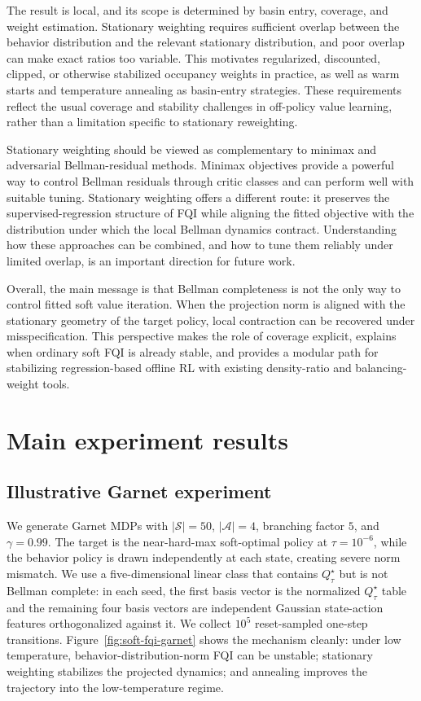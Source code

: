 \documentclass{article}
\theoremstyle{plain}
\theoremstyle{definition}
\theoremstyle{remark}
\begin{document}
The result is local, and its scope is determined by basin entry, coverage, and
weight estimation. Stationary weighting requires sufficient overlap between the
behavior distribution and the relevant stationary distribution, and poor overlap
can make exact ratios too variable. This motivates regularized, discounted,
clipped, or otherwise stabilized occupancy weights in practice, as well as warm
starts and temperature annealing as basin-entry strategies. These requirements
reflect the usual coverage and stability challenges in off-policy value
learning, rather than a limitation specific to stationary reweighting.

Stationary weighting should be viewed as complementary to minimax and
adversarial Bellman-residual methods. Minimax objectives provide a powerful way
to control Bellman residuals through critic classes and can perform well with
suitable tuning. Stationary weighting offers a different route: it preserves the
supervised-regression structure of FQI while aligning the fitted objective with
the distribution under which the local Bellman dynamics contract. Understanding
how these approaches can be combined, and how to tune them reliably under
limited overlap, is an important direction for future work.

Overall, the main message is that Bellman completeness is not the only way to
control fitted soft value iteration. When the projection norm is aligned with
the stationary geometry of the target policy, local contraction can be recovered
under misspecification. This perspective makes the role of coverage explicit,
explains when ordinary soft FQI is already stable, and provides a modular path
for stabilizing regression-based offline RL with existing density-ratio and
balancing-weight tools.

 

\section{Main experiment results}
\subsection{Illustrative Garnet experiment}
\label{appendix::expgarnet}
We generate Garnet MDPs \citep{bhatnagar2009natural} with
\(|\mathcal S|=50\), \(|\mathcal A|=4\), branching factor \(5\), and
\(\gamma=0.99\). The target is the near-hard-max soft-optimal policy at
\(\tau=10^{-6}\), while the behavior policy is drawn independently at each
state, creating severe norm mismatch. We use a five-dimensional linear class
that contains \(Q^\star_\tau\) but is not Bellman complete: in each seed, the
first basis vector is the normalized \(Q^\star_\tau\) table and the remaining
four basis vectors are independent Gaussian state-action features orthogonalized
against it. We collect \(10^5\) reset-sampled one-step transitions.
Figure~\ref{fig:soft-fqi-garnet}
shows the mechanism cleanly: under low temperature, behavior-distribution-norm FQI can be
unstable; stationary weighting stabilizes the projected dynamics; and
annealing improves the trajectory into the low-temperature regime.
\end{document}
